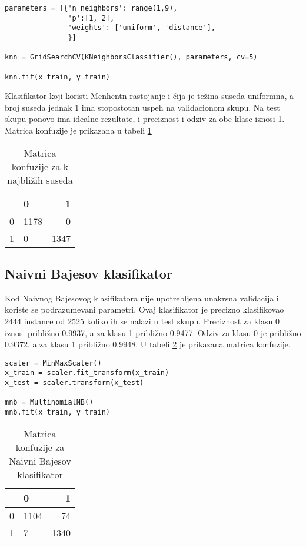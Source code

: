 \documentclass[a4paper]{article}
\begin{document}
\begin{lstlisting}[caption={Obučavanje modela k najbližih suseda},frame=single, label=simple]
parameters = [{'n_neighbors': range(1,9),
               'p':[1, 2],
               'weights': ['uniform', 'distance'],
               }]

knn = GridSearchCV(KNeighborsClassifier(), parameters, cv=5)

knn.fit(x_train, y_train)
\end{lstlisting}

Klasifikator koji koristi Menhentn rastojanje i čija je težina suseda uniformna, a broj suseda jednak 1 ima stopostotan uspeh na validacionom skupu. Na test skupu ponovo ima idealne rezultate, i preciznost i odziv za obe klase iznosi 1. Matrica konfuzije je prikazana u tabeli \ref{tab:matKonfKNN}

\begin{table}[h!]
\begin{center}
\caption{Matrica konfuzije za k najbližih suseda}
\begin{tabular}{|c|l|r|} \hline
& 0& 1\\ \hline
0 &1178&0\\ \hline
1 &0&1347\\ \hline
\end{tabular}
\label{tab:matKonfKNN}
\end{center}
\end{table}


\subsection{Naivni Bajesov klasifikator}
Kod Naivnog Bajesovog klasifikatora nije upotrebljena unakrsna validacija i koriste se podrazumevani parametri. Ovaj klasifikator je precizno klasifikovao 2444 instance od 2525 koliko ih se nalazi u test skupu. Preciznost za klasu 0 iznosi približno 0.9937, a za klasu 1 približno 0.9477. Odziv za klasu 0 je približno 0.9372, a za klasu 1 približno 0.9948. U tabeli \ref{tab:matKonfMNB} je prikazana matrica konfuzije.

\begin{lstlisting}[caption={Obučavanje Naivnog Bajesovog klasifikatora},frame=single, label=simple]
scaler = MinMaxScaler()
x_train = scaler.fit_transform(x_train)
x_test = scaler.transform(x_test)

mnb = MultinomialNB()
mnb.fit(x_train, y_train)
\end{lstlisting}

\begin{table}[h!]
\begin{center}
\caption{Matrica konfuzije za Naivni Bajesov klasifikator}
\begin{tabular}{|c|l|r|} \hline
& 0& 1\\ \hline
0 &1104&74\\ \hline
1 &7&1340\\ \hline
\end{tabular}
\label{tab:matKonfMNB}
\end{center}
\end{table}
\end{document}
